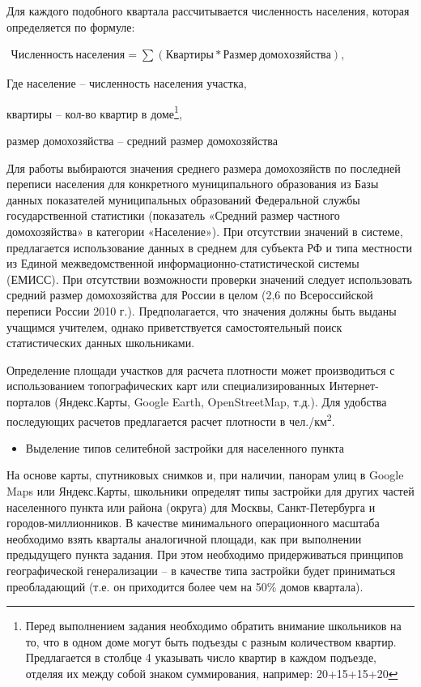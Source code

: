 \documentclass[
  11pt,
  russian,
]{book}
\providecommand{\tightlist}{%
  \setlength{\itemsep}{0pt}\setlength{\parskip}{0pt}}
\begin{document}
Для каждого подобного квартала рассчитывается численность населения, которая определяется по формуле:

\(\begin{aligned} Численность\ населения = \sum (Квартиры*Размер\ домохозяйства), \end{aligned}\)

Где население -- численность населения участка,

квартиры -- кол-во квартир в доме\footnote{Перед выполнением задания необходимо обратить внимание школьников на то, что в одном доме могут быть подъезды с разным количеством квартир. Предлагается в столбце 4 указывать число квартир в каждом подъезде, отделяя их между собой знаком суммирования, например: 20+15+15+20},

размер домохозяйства -- средний размер домохозяйства

Для работы выбираются значения среднего размера домохозяйств по последней переписи населения для конкретного муниципального образования из Базы данных показателей муниципальных образований Федеральной службы государственной статистики (показатель «Средний размер частного домохозяйства» в категории «Население»). При отсутствии значений в системе, предлагается использование данных в среднем для субъекта РФ и типа местности из Единой межведомственной информационно-статистической системы (ЕМИСС). При отсутствии возможности проверки значений следует использовать средний размер домохозяйства для России в целом (2,6 по Всероссийской переписи России 2010 г.). Предполагается, что значения должны быть выданы учащимся учителем, однако приветствуется самостоятельный поиск статистических данных школьниками.

Определение площади участков для расчета плотности может производиться с использованием топографических карт или специализированных Интернет-порталов (Яндекс.Карты, Google Earth, OpenStreetMap, т.д.). Для удобства последующих расчетов предлагается расчет плотности в чел./км\textsuperscript{2}.

\begin{itemize}
\tightlist
\item
  Выделение типов селитебной застройки для населенного пункта
\end{itemize}

На основе карты, спутниковых снимков и, при наличии, панорам улиц в Google Maps или Яндекс.Карты, школьники определят типы застройки для других частей населенного пункта или района (округа) для Москвы, Санкт-Петербурга и городов-миллионников. В качестве минимального операционного масштаба необходимо взять кварталы аналогичной площади, как при выполнении предыдущего пункта задания. При этом необходимо придерживаться принципов географической генерализации -- в качестве типа застройки будет приниматься преобладающий (т.е. он приходится более чем на 50\% домов квартала).
\end{document}
